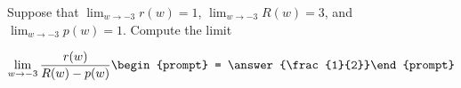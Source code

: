 \documentclass{ximera}
\author{Matthew Carr}
\begin{document}
\begin{exercise}
Suppose that $\lim_{w\to-3}r(w)=1$, $\lim_{w\to-3}R(w)=3$, and $\lim_{w\to-3}p(w)=1$. Compute the limit

\[
\lim_{w\to -3 } \frac{r(w)}{R(w)-p(w)}\begin{prompt} = \answer{\frac{1}{2}}\end{prompt}
\]
\end{exercise}
\end{document}
